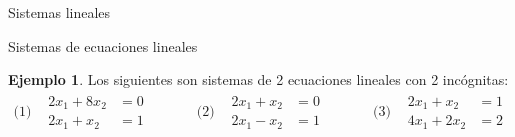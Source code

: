 \documentclass[a4paper,12pt,twoside,spanish,reqno]{amsbook}
\theoremstyle{definition}
\newtheorem{ejemplo}{Ejemplo}[section]
\theoremstyle{remark}
\begin{document}
\begin{chapter}{Sistemas lineales}
\begin{section}{Sistemas de ecuaciones lineales}
            \begin{ejemplo}
                Los siguientes son sistemas de 2 ecuaciones lineales con 2 incógnitas:
                \begin{equation*}
                \begin{matrix}
                \text{(1)} & 
                \begin{matrix}
                2x_1 + 8x_2 &= 0 &  \\
                2x_1 + x_2 &=  1& 
                \end{matrix} &\quad&
                \text{(2)} & 
                \begin{matrix}
                2x_1 + x_2 &= 0 &  \\
                2x_1 - x_2 &=  1& 
                \end{matrix} &\quad&
                \text{(3)} & 
                \begin{matrix}
                2x_1 + x_2 &= 1 &  \\
                4x_1 +2 x_2 &=  2& 
                \end{matrix} 
                \end{matrix}
                \end{equation*}
            \end{ejemplo} 
            

\end{section}
\end{chapter}
\end{document}
